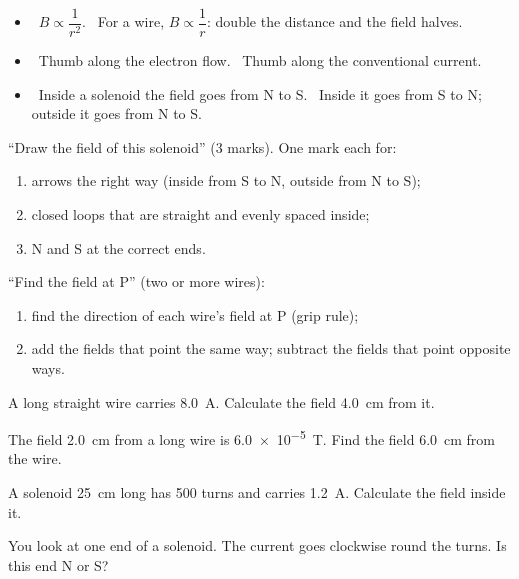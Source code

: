 \begin{mistakes}
\begin{itemize}
  \item \xmark\ $B \propto \dfrac{1}{r^2}$. \cmark\ For a wire, $B \propto \dfrac{1}{r}$: double
        the distance and the field halves.
  \item \xmark\ Thumb along the electron flow. \cmark\ Thumb along the conventional current.
  \item \xmark\ Inside a solenoid the field goes from N to S. \cmark\ Inside it goes from S to N;
        outside it goes from N to S.
\end{itemize}
\end{mistakes}

\begin{examtip}
``Draw the field of this solenoid'' (3 marks). One mark each for:
\begin{enumerate}
  \item arrows the right way (inside from S to N, outside from N to S);
  \item closed loops that are straight and evenly spaced inside;
  \item N and S at the correct ends.
\end{enumerate}
``Find the field at P'' (two or more wires):
\begin{enumerate}
  \item find the direction of each wire's field at P (grip rule);
  \item add the fields that point the same way; subtract the fields that point opposite ways.
\end{enumerate}
\end{examtip}

\begin{quickcheck}
  \item A long straight wire carries \qty{8.0}{A}. Calculate the field \qty{4.0}{cm} from it.
  \item The field \qty{2.0}{cm} from a long wire is \qty{6.0e-5}{T}. Find the field
        \qty{6.0}{cm} from the wire.
  \item A solenoid \qty{25}{cm} long has 500 turns and carries \qty{1.2}{A}. Calculate the field
        inside it.
  \item You look at one end of a solenoid. The current goes clockwise round the turns. Is this
        end N or S?
\end{quickcheck}

